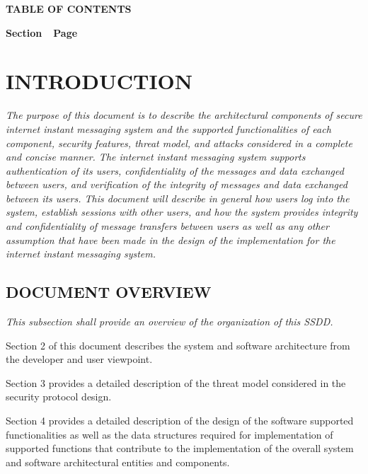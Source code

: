 \documentclass[twoside,letterpaper]{article}
\begin{document}
{\centering{}\bfseries\color{black}
TABLE OF CONTENTS
\par}

{\bfseries\color{black}
Section\ \ Page}

\setcounter{tocdepth}{9}
\renewcommand\contentsname{}
\tableofcontents

\bigskip

\bigskip
\clearpage\setcounter{page}{1}\pagestyle{Standard}
\section[INTRODUCTION]{\bfseries\color{black}
INTRODUCTION}
{\itshape\color{black}
The purpose of this document is to describe the architectural components of secure internet instant 
messaging system and the supported functionalities of each component, security features, 
threat model, and attacks considered in a complete and concise manner. 
The internet instant messaging system supports authentication of its users, 
confidentiality of the messages and data exchanged between users, and 
verification of the integrity of messages and data exchanged between its users. 
This document will describe in general how users log into the system, establish
 sessions with other users, and how the system provides integrity and confidentiality 
 of message transfers between users as well as any other assumption that 
 have been made in the design of the implementation for the internet instant 
 messaging system. \ }

\bigskip

\subsection{DOCUMENT OVERVIEW}
{\itshape\color{black}
This subsection shall provide an overview of the organization of this
SSDD.}

{\color{black}
Section 2 of this document describes the system and software
architecture from the developer and user viewpoint. \ }

{\color{black}
Section 3 provides a detailed description of the threat model considered 
in the security protocol design. \ }

{\color{black}
Section 4 provides a detailed description of the design of the software supported
functionalities as well as the data structures required for implementation
of supported functions that contribute to the implementation of the overall
system and software architectural entities and components.  \ }
\end{document}

